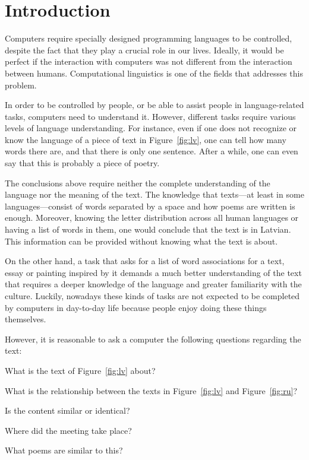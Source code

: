 \chapter{Introduction}
\label{ch:introduction}


Computers require specially designed programming languages to be controlled, despite the fact that they play a crucial role in our lives. Ideally, it would be perfect if the interaction with computers was not different from the interaction between humans. Computational linguistics is one of the fields that addresses this problem.

In order to be controlled by people, or be able to assist people in language-related tasks, computers need to understand it. However, different tasks require various levels of language understanding. For instance, even if one does not recognize or know the language of a piece of text in Figure~\ref{fig:lv}, one can tell how many words there are, and that there is only one sentence. After a while, one can even say that this is probably a piece of poetry.
%
%
%
%
%
%

The conclusions above require neither the complete understanding of the language nor the meaning of the text. The knowledge that texts---at least in some languages---consist of words separated by a space and how poems are written is enough. Moreover, knowing the letter distribution across all human languages or having a list of words in them, one would conclude that the text is in Latvian. This information can be provided without knowing what the text is about.



On the other hand, a task that asks for a list of  word associations for a text, essay or  painting inspired by it demands a much better understanding of the text that requires a deeper knowledge of the language and greater familiarity with the culture. Luckily, nowadays these kinds of tasks are not expected to be completed by computers in day-to-day life because people enjoy doing these things themselves.

However, it is reasonable to ask a computer the following questions regarding the text:
\begin{inparaenum}[a)]
\item What is the text of Figure~\ref{fig:lv} about?
\item What is the relationship between the texts in Figure~\ref{fig:lv} and
  Figure~\ref{fig:ru}?
\item Is the content similar or identical?
\item Where did the meeting take place?
\item What poems are similar to this?
\end{inparaenum}

